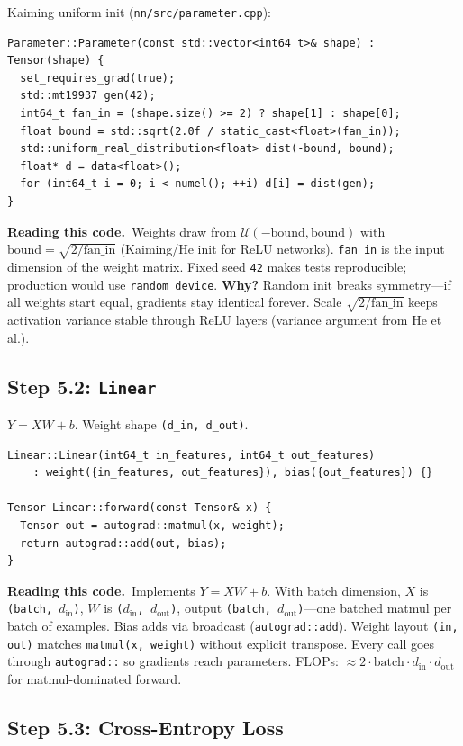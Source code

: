 \documentclass[11pt,a4paper]{article}
\newcommand{\explain}{\par\smallskip\noindent}
\newcommand{\exhead}{\textbf{Reading this code.}\ }
\begin{document}
Kaiming uniform init (\texttt{nn/src/parameter.cpp}):
\begin{lstlisting}[style=cpp]
Parameter::Parameter(const std::vector<int64_t>& shape) : Tensor(shape) {
  set_requires_grad(true);
  std::mt19937 gen(42);
  int64_t fan_in = (shape.size() >= 2) ? shape[1] : shape[0];
  float bound = std::sqrt(2.0f / static_cast<float>(fan_in));
  std::uniform_real_distribution<float> dist(-bound, bound);
  float* d = data<float>();
  for (int64_t i = 0; i < numel(); ++i) d[i] = dist(gen);
}
\end{lstlisting}
\explain\exhead Weights draw from $\mathcal{U}(-\text{bound}, \text{bound})$ with
$\text{bound} = \sqrt{2/\text{fan\_in}}$ (Kaiming/He init for ReLU networks). \texttt{fan\_in}
is the input dimension of the weight matrix. Fixed seed \texttt{42} makes tests reproducible;
production would use \texttt{random\_device}. \textbf{Why?} Random init breaks symmetry---if
all weights start equal, gradients stay identical forever. Scale $\sqrt{2/\text{fan\_in}}$ keeps
activation variance stable through ReLU layers (variance argument from He et al.).

\subsection{Step 5.2: \texttt{Linear}}

$Y = XW + b$. Weight shape \texttt{(d\_in, d\_out)}.

\begin{lstlisting}[style=cpp]
Linear::Linear(int64_t in_features, int64_t out_features)
    : weight({in_features, out_features}), bias({out_features}) {}

Tensor Linear::forward(const Tensor& x) {
  Tensor out = autograd::matmul(x, weight);
  return autograd::add(out, bias);
}
\end{lstlisting}
\explain\exhead Implements $Y = XW + b$. With batch dimension, $X$ is \texttt{(batch, $d_\text{in}$)},
$W$ is \texttt{($d_\text{in}$, $d_\text{out}$)}, output \texttt{(batch, $d_\text{out}$)}---one
batched matmul per batch of examples. Bias adds via broadcast (\texttt{autograd::add}). Weight
layout \texttt{(in, out)} matches \texttt{matmul(x, weight)} without explicit transpose. Every
call goes through \texttt{autograd::} so gradients reach parameters. FLOPs: $\approx
2 \cdot \text{batch} \cdot d_\text{in} \cdot d_\text{out}$ for matmul-dominated forward.

\subsection{Step 5.3: Cross-Entropy Loss}
\end{document}
